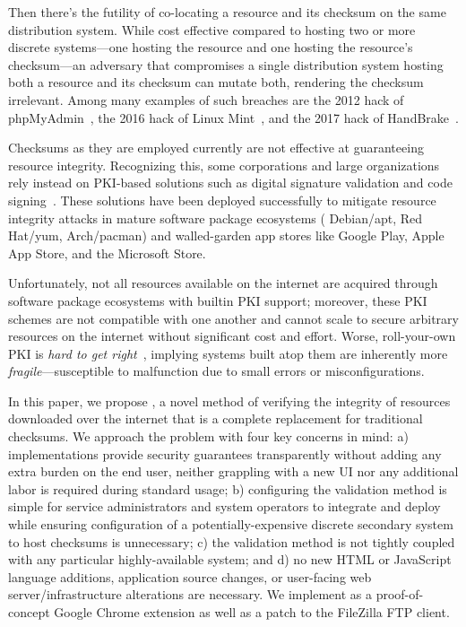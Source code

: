 Then there's the futility of co-locating a resource and its checksum on the same
distribution system. While cost effective compared to hosting two or more
discrete systems---one hosting the resource and one hosting the resource's
checksum---an adversary that compromises a single distribution system hosting
both a resource and its checksum can mutate both, rendering the checksum
irrelevant. Among many examples of such breaches are the 2012 hack of
phpMyAdmin~\cite{SCA-PMA1, SCA-PMA2}, the 2016 hack of Linux
Mint~\cite{SCA-MINT1, SCA-MINT2}, and the 2017 hack of HandBrake~\cite{SCA-HB2}.

Checksums as they are employed currently are not effective at guaranteeing
resource integrity. Recognizing this, some corporations and large organizations
rely instead on PKI-based solutions such as digital signature validation and
code signing~\cite{PKI}. These solutions have been deployed successfully to
mitigate resource integrity attacks in mature software package ecosystems (\eg
Debian/apt, Red Hat/yum, Arch/pacman) and walled-garden app stores like Google
Play, Apple App Store, and the Microsoft Store.

Unfortunately, not all resources available on the internet are acquired through
software package ecosystems with builtin PKI support; moreover, these PKI
schemes are not compatible with one another and cannot scale to secure arbitrary
resources on the internet without significant cost and effort. Worse,
roll-your-own PKI is \emph{hard to get right}~\cite{PKI}, implying systems built
atop them are inherently more \emph{fragile}---susceptible to malfunction due
to small errors or misconfigurations.

In this paper, we propose \SYSTEM{}, a novel method of verifying the integrity
of resources downloaded over the internet that is a complete replacement for
traditional checksums. We approach the problem with four key concerns in mind:
a) implementations provide security guarantees transparently without adding any
extra burden on the end user, \ie neither grappling with a new UI nor any
additional labor is required during standard usage; b) configuring the
validation method is simple for service administrators and system operators to
integrate and deploy while ensuring configuration of a potentially-expensive
discrete secondary system to host checksums is unnecessary; c) the validation
method is not tightly coupled with any particular highly-available system; and
d) no new HTML or JavaScript language additions, application source changes, or
user-facing web server/infrastructure alterations are necessary. We implement
\SYSTEM{} as a proof-of-concept Google Chrome extension as well as a patch to
the FileZilla FTP client.

